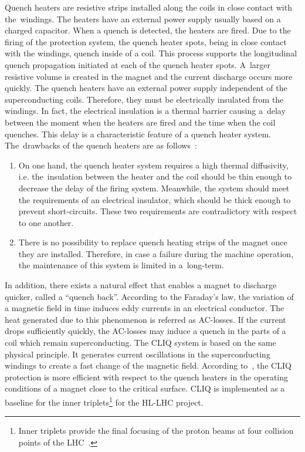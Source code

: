 Quench heaters are resistive strips installed along the coils in close contact with the~windings. The heaters have an external power supply usually based on a charged capacitor. When a quench is detected, the heaters are fired. Due to the firing of the protection system, the quench heater spots, being in close contact with the windings, quench inside of a coil. This process supports the longitudinal quench propagation initiated at each of the quench heater spots. A~larger resistive volume is created in the magnet and the current discharge occurs more quickly. The quench heaters have an external power supply independent of the superconducting coils. Therefore, they must be electrically insulated from the windings. In fact, the electrical insulation is a thermal barrier causing a~delay between the moment when the heaters are fired and the time when the coil quenches. This delay is a characteristic feature of a quench heater system. The~drawbacks of the quench heaters are as follows~\cite{salmiquenchheateroptimization}: 

\begin{enumerate}
    \item On one hand, the quench heater system requires a high thermal diffusivity, i.e. the~insulation between the heater and the coil should be thin enough to decrease the delay of the firing system. Meanwhile, the system should meet the requirements of an electrical insulator, which should be thick enough to prevent short-circuits. These two requirements are contradictory with respect to one another. 
	\item There is no possibility to replace quench heating strips of the magnet once they are installed. Therefore, in case a failure during the machine operation, the maintenance of this system is limited in a~long-term. 
\end{enumerate}

In addition, there exists a natural effect that enables a magnet to discharge quicker, called a “quench back”. According to the Faraday’s law, the variation of a magnetic field in time induces eddy currents in an electrical conductor. The heat generated due to this phenomenon is referred as AC-losses. If the current drops sufficiently quickly, the AC-losses may induce a quench in the parts of a coil which remain superconducting. The CLIQ system is based on the same physical principle. It generates current oscillations in the superconducting windings to create a fast change of the magnetic field. According to~\cite{ravaioli_cliq_phd_thesis}, the CLIQ protection is more efficient with respect to the quench heaters in the operating conditions of a magnet close to the critical surface. CLIQ is implemented as a baseline for the inner triplets\footnote{Inner triplets provide the final focusing of the proton beams at four collision points of the LHC~\cite{lhc_inner_triplet_powering_strategy}.} for the HL-LHC project.

